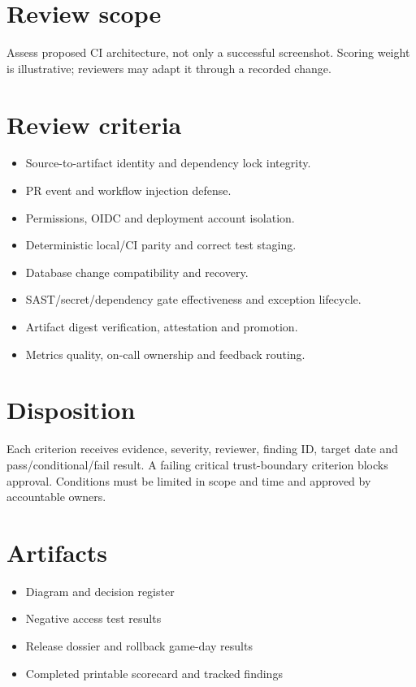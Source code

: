 \documentclass[11pt,letterpaper]{article}
\begin{document}
\makedoctitle
\makedocsummary
\tableofcontents
\clearpage
\section{Review scope}
Assess proposed CI architecture, not only a successful screenshot. Scoring weight is illustrative; reviewers may adapt it through a recorded change.

\section{Review criteria}
\begin{itemize}
\item Source-to-artifact identity and dependency lock integrity.
\item PR event and workflow injection defense.
\item Permissions, OIDC and deployment account isolation.
\item Deterministic local/CI parity and correct test staging.
\item Database change compatibility and recovery.
\item SAST/secret/dependency gate effectiveness and exception lifecycle.
\item Artifact digest verification, attestation and promotion.
\item Metrics quality, on-call ownership and feedback routing.
\end{itemize}
\section{Disposition}
Each criterion receives evidence, severity, reviewer, finding ID, target date and pass/conditional/fail result. A failing critical trust-boundary criterion blocks approval. Conditions must be limited in scope and time and approved by accountable owners.

\section{Artifacts}
\begin{itemize}
\item Diagram and decision register
\item Negative access test results
\item Release dossier and rollback game-day results
\item Completed printable scorecard and tracked findings
\end{itemize}
\end{document}
